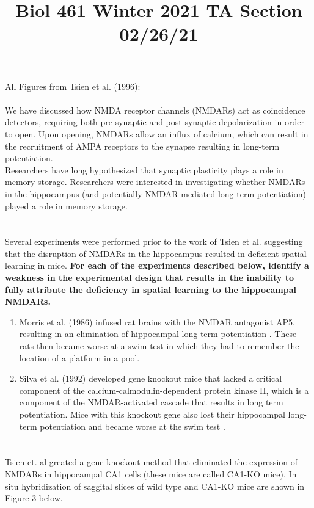 \documentclass{article}
\title{Biol 461 Winter 2021 TA Section 02/26/21}
\author{}
\date{}
\begin{document}
\FloatBarrier

\maketitle
All Figures from Tsien et al. (1996)\cite{tsien_huerta_tonegawa_1996}:
\\
\\
\indent We have discussed how NMDA receptor channels (NMDARs) act as coincidence detectors, requiring both pre-synaptic and post-synaptic depolarization in order to open. Upon opening, NMDARs allow an influx of calcium, which can result in the recruitment of AMPA receptors to the synapse resulting in long-term potentiation.\\
\indent Researchers have long hypothesized that synaptic plasticity plays a role in memory storage. Researchers were interested in investigating whether NMDARs in the hippocampus (and potentially NMDAR mediated long-term potentiation) played a role in memory storage.  

\section{}
Several experiments were performed prior to the work of Tsien et al. suggesting that the disruption of NMDARs in the hippocampus resulted in deficient spatial learning in mice. \textbf{For each of the experiments described below, identify a weakness in the experimental design that results in the inability to fully attribute the deficiency in spatial learning to the hippocampal NMDARs.}
\begin{enumerate}
    \item Morris et al. (1986) infused rat brains with the NMDAR antagonist AP5, resulting in an elimination of hippocampal long-term-potentiation \cite{morris_1989}. These rats then became worse at a swim test in which they had to remember the location of a platform in a pool.
    \vspace{3.5cm}
    \item Silva et al. (1992) developed gene knockout mice that lacked a critical component of the calcium-calmodulin-dependent protein kinase II, which is a component of the NMDAR-activated cascade that results in long term potentiation. Mice with this knockout gene also lost their hippocampal long-term potentiation and became worse at the swim test \cite{silva_stevens_tonegawa_wang_1992}.
\end{enumerate}
\pagebreak
\section{}
Tsien et. al greated a gene knockout method that eliminated the expression of NMDARs in hippocampal CA1 cells (these mice are called CA1-KO mice). In situ hybridization of saggital slices of wild type and CA1-KO mice are shown in Figure 3 below.
\end{document}
